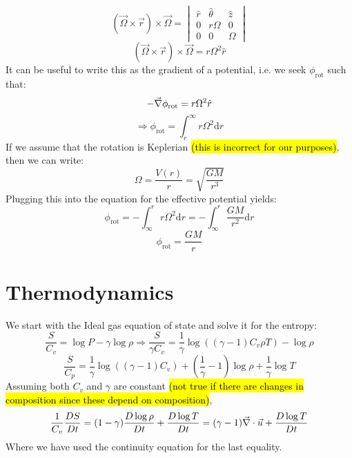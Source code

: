\documentclass[apj,onecolumn]{emulateapj}
\newcommand{\uvec}{\ensuremath{\vec{u}}} %
\begin{document}
\begin{equation}
\left(\vec{\Omega}\times\vec{r}\right)\times\vec{\Omega} = 
\begin{vmatrix*}
 \hat{r} & \hat{\theta} & \hat{z} \\
    0    &   r\Omega    &  0\\
    0    &     0        & \Omega
\end{vmatrix*}
\end{equation}
\begin{equation}
\left(\vec{\Omega}\times\vec{r}\right)\times\vec{\Omega} = r\Omega^2\hat{r}
\end{equation}
It can be useful to write this as the gradient of a potential, i.e. we seek 
$\phi_{\mathrm{rot}}$ such that:
\begin{equation}
-\del\phi_{\mathrm{rot}} = r\Omega^2\hat{r}
\end{equation}
\begin{equation}
\Rightarrow\phi_{\mathrm{rot}} = \int_r^\infty r\Omega^2\mathrm{d}r
\end{equation}
If we assume that the rotation is Keplerian \hl{(this is incorrect for our 
purposes)}, then we can write:
\begin{equation}
\Omega = \frac{V(r)}{r} = \sqrt{\frac{G M}{r^3}}
\end{equation}
Plugging this into the equation for the effective potential yields:
\begin{equation}
\phi_{\mathrm{rot}} = -\int_\infty^r r\Omega^2\mathrm{d}r =
                      -\int_\infty^r \frac{G M}{r^2}\mathrm{d}r
\end{equation}
\begin{equation}
\phi_{\mathrm{rot}} = \frac{G M}{r}
\end{equation}


\section{Thermodynamics}
\label{sec:thermo}
We start with the Ideal gas equation of state and solve it for the entropy:
\begin{equation}
\frac{S}{C_v} = \log P - \gamma \log \rho \Rightarrow
\frac{S}{\gamma C_v} =
         \frac{1}{\gamma}\log\left((\gamma - 1)C_v\rho T\right) - \log\rho
\end{equation}
\begin{equation}
\frac{S}{C_p} = \frac{1}{\gamma}\log\left((\gamma - 1)C_v\right) +
              \left(\frac{1}{\gamma}-1\right)\log\rho +
              \frac{1}{\gamma}\log T
\end{equation}
Assuming both $C_v$ and $\gamma$ are constant \hl{(not true if there are 
changes in composition since these depend on composition)},
\begin{equation}
\frac{1}{C_v}\DxDt{S} = (1-\gamma)\DxDt{\log\rho} + \DxDt{\log T} =
 (\gamma -1)\del\cdot\uvec + \DxDt{\log T}
\end{equation}
Where we have used the continuity equation for the last equality.
\end{document}
